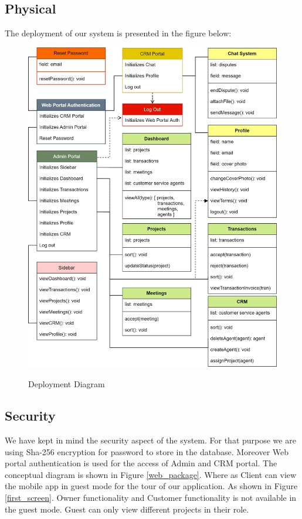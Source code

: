 \subsection{Physical}
The deployment of our system is presented in the figure below:
\begin{figure}[H]
	\begin{center}
		{\includegraphics[scale=.9]{figures/web Concept/web-deployment (1).png}}
		\caption{Deployment Diagram}
		\label{fig:dep}
	\end{center}
\end{figure}

\subsection{Security}
We have kept in mind the security aspect of the system. For that purpose we are using Sha-256 encryption for password to store in the database. Moreover Web portal authentication is used for the access of Admin and CRM portal. The conceptual diagram is shown in Figure \ref{web_package}.
Where as Client can view the mobile app in guest mode for the tour of our application. As shown in Figure \ref{first_screen}. Owner functionality and Customer functionality is not available in the guest mode. Guest can only view different projects in their role.

